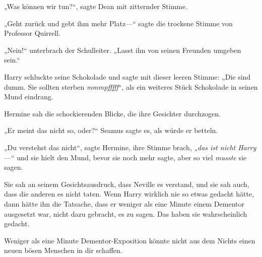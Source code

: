 „Was können wir tun?“, sagte Dean mit zitternder Stimme.

„Geht zurück und gebt ihm mehr Platz—“ sagte die trockene Stimme von Professor Quirrell.

„Nein!“ unterbrach der Schulleiter. „Lasst ihn von seinen Freunden umgeben sein.“

Harry schluckte seine Schokolade und sagte mit dieser leeren Stimme: „Die sind dumm. Sie sollten sterben \emph{mmmpfffff}“, als ein weiteres Stück Schokolade in seinen Mund eindrang.

Hermine sah die schockierenden Blicke, die ihre Gesichter durchzogen.

„Er meint das nicht so, oder?“ Seamus sagte es, als würde er betteln.

„Du verstehst das nicht“, sagte Hermine, ihre Stimme brach, „\emph{das ist nicht Harry}—“ und sie hielt den Mund, bevor sie noch mehr sagte, aber so viel \emph{musste} sie sagen.

Sie sah an seinem Gesichtsausdruck, dass Neville es verstand, und sie sah auch, dass die anderen es nicht taten. Wenn Harry wirklich nie so etwas gedacht hätte, dann hätte ihn die Tatsache, dass er weniger als eine Minute einem Dementor ausgesetzt war, nicht dazu gebracht, es zu sagen. Das haben sie wahrscheinlich gedacht.

Weniger als eine Minute Dementor-Exposition könnte nicht aus dem Nichts einen neuen bösen Menschen in dir schaffen.

